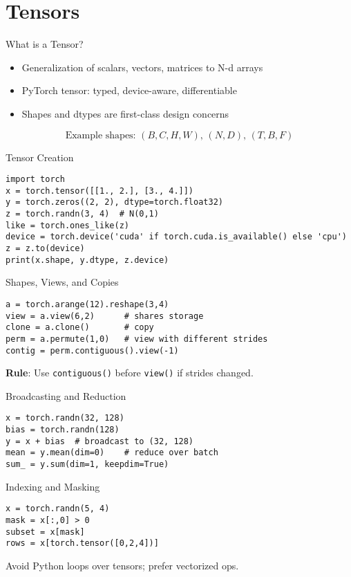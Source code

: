 \documentclass[aspectratio=169,10pt]{beamer}
\begin{document}
\section{Tensors}

\begin{frame}{What is a Tensor?}
\begin{itemize}
    \item Generalization of scalars, vectors, matrices to N-d arrays
    \item PyTorch tensor: typed, device-aware, differentiable
    \item Shapes and dtypes are first-class design concerns
\end{itemize}
\[\text{Example shapes: } (B,C,H,W),\, (N, D),\, (T, B, F)\]
\end{frame}

\begin{frame}[fragile]{Tensor Creation}
\begin{lstlisting}
import torch
x = torch.tensor([[1., 2.], [3., 4.]])
y = torch.zeros((2, 2), dtype=torch.float32)
z = torch.randn(3, 4)  # N(0,1)
like = torch.ones_like(z)
device = torch.device('cuda' if torch.cuda.is_available() else 'cpu')
z = z.to(device)
print(x.shape, y.dtype, z.device)
\end{lstlisting}
\end{frame}

\begin{frame}[fragile]{Shapes, Views, and Copies}
\begin{lstlisting}
a = torch.arange(12).reshape(3,4)
view = a.view(6,2)      # shares storage
clone = a.clone()       # copy
perm = a.permute(1,0)   # view with different strides
contig = perm.contiguous().view(-1)
\end{lstlisting}
\textbf{Rule}: Use \texttt{contiguous()} before \texttt{view()} if strides changed.
\end{frame}

\begin{frame}[fragile]{Broadcasting and Reduction}
\begin{lstlisting}
x = torch.randn(32, 128)
bias = torch.randn(128)
y = x + bias  # broadcast to (32, 128)
mean = y.mean(dim=0)    # reduce over batch
sum_ = y.sum(dim=1, keepdim=True)
\end{lstlisting}
\end{frame}

\begin{frame}[fragile]{Indexing and Masking}
\begin{lstlisting}
x = torch.randn(5, 4)
mask = x[:,0] > 0
subset = x[mask]
rows = x[torch.tensor([0,2,4])]
\end{lstlisting}
Avoid Python loops over tensors; prefer vectorized ops.
\end{frame}
\end{document}
